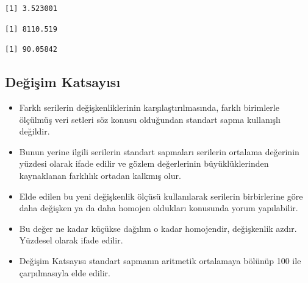 \documentclass[
  letterpaper,
  DIV=11,
  numbers=noendperiod]{scrreprt}
\newenvironment{Shaded}{\begin{snugshade}}{\end{snugshade}}
\newcommand{\AttributeTok}[1]{\textcolor[rgb]{0.40,0.45,0.13}{#1}}
\newcommand{\ConstantTok}[1]{\textcolor[rgb]{0.56,0.35,0.01}{#1}}
\newcommand{\FunctionTok}[1]{\textcolor[rgb]{0.28,0.35,0.67}{#1}}
\newcommand{\NormalTok}[1]{\textcolor[rgb]{0.00,0.23,0.31}{#1}}
\newcommand{\SpecialCharTok}[1]{\textcolor[rgb]{0.37,0.37,0.37}{#1}}
\begin{document}
\begin{verbatim}
[1] 3.523001
\end{verbatim}

\begin{Shaded}
\end{Shaded}

\begin{verbatim}
[1] 8110.519
\end{verbatim}

\begin{Shaded}
\end{Shaded}

\begin{verbatim}
[1] 90.05842
\end{verbatim}

\hypertarget{deux11fiux15fim-katsayux131sux131}{%
\subsection*{Değişim
Katsayısı}\label{deux11fiux15fim-katsayux131sux131}}

\begin{itemize}
\item
  Farklı serilerin değişkenliklerinin karşılaştırılmasında, farklı
  birimlerle ölçülmüş veri setleri söz konusu olduğundan standart sapma
  kullanışlı değildir.
\item
  Bunun yerine ilgili serilerin standart sapmaları serilerin ortalama
  değerinin yüzdesi olarak ifade edilir ve gözlem değerlerinin
  büyüklüklerinden kaynaklanan farklılık ortadan kalkmış olur.
\item
  Elde edilen bu yeni değişkenlik ölçüsü kullanılarak serilerin
  birbirlerine göre daha değişken ya da daha homojen oldukları konusunda
  yorum yapılabilir.
\item
  Bu değer ne kadar küçükse dağılım o kadar homojendir, değişkenlik
  azdır. Yüzdesel olarak ifade edilir.
\item
  Değişim Katsayısı standart sapmanın aritmetik ortalamaya bölünüp 100
  ile çarpılmasıyla elde edilir.
\end{itemize}
\end{document}
